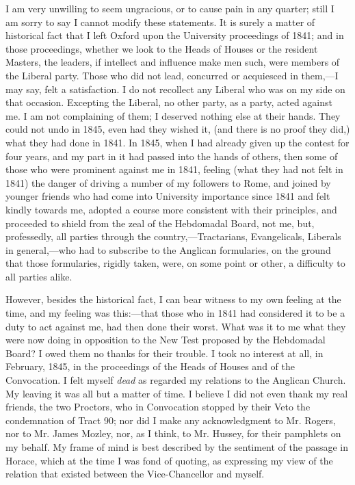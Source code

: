 I am very unwilling to seem ungracious, or to cause pain in any
quarter; still I am sorry to say I cannot modify these statements. It is
surely a matter of historical fact that I left Oxford upon the
University proceedings of 1841; and in those proceedings, whether we
look to the Heads of Houses or the resident Masters, the leaders, if
intellect and influence make men such, were members of the Liberal
party. Those who did not lead, concurred or acquiesced in them,—I may
say, felt a satisfaction. I do not recollect any Liberal who was on my
side on that occasion. Excepting the Liberal, no other party, as a
party, acted against me. I am not complaining of them; I deserved
nothing else at their hands. They could not undo in 1845, even had they
wished it, (and there is no proof they did,) what they had done in 1841.
In 1845, when I had already given up the contest for four years, and my
part in it had passed into the hands of others, then some
of those who were prominent against me in 1841, feeling (what they had
not felt in 1841) the danger of driving a number of my followers
to Rome, and joined by younger friends who had come into University
importance since 1841 and felt kindly towards me, adopted a course more
consistent with their principles, and proceeded to shield from the zeal
of the Hebdomadal Board, not me, but, professedly, all parties through
the country,—Tractarians, Evangelicals, Liberals in general,—who had
to subscribe to the Anglican formularies, on the ground that those
formularies, rigidly taken, were, on some point or other, a difficulty
to all parties alike.

However, besides the historical fact, I can bear witness to my own
feeling at the time, and my feeling was this:—that those who in 1841
had considered it to be a duty to act against me, had then done their
worst. What was it to me what they were now doing in opposition to the New
Test proposed by the Hebdomadal Board? I owed them no thanks for their
trouble. I took no interest at all, in February, 1845, in the
proceedings of the Heads of Houses and of the Convocation. I felt myself
\emph{dead} as regarded my relations to the Anglican Church. My leaving
it was all but a matter of time. I believe I did not even thank my real
friends, the two Proctors, who in Convocation stopped by their Veto the
condemnation of Tract 90; nor did I make any acknowledgment to Mr.
Rogers, nor to Mr. James Mozley, nor, as I think, to Mr. Hussey, for
their pamphlets on my behalf. My frame of mind is best described by the
sentiment of the passage in Horace, which at the time I was fond of
quoting, as expressing my view of the relation that existed between the
Vice-Chancellor and myself.

